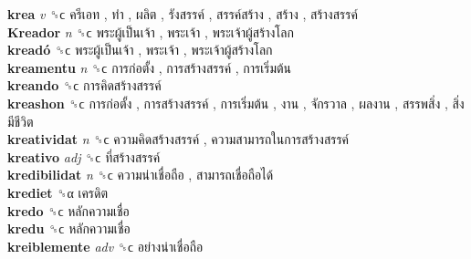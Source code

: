 \textbf{krea} \emph{v}  ␝ϲ   ครีเอท ,  ทำ ,  ผลิต ,  รังสรรค์ ,  สรรค์สร้าง ,  สร้าง ,  สร้างสรรค์   \\
\textbf{Kreador} \emph{n}  ␝ϲ   พระผู้เป็นเจ้า ,  พระเจ้า ,  พระเจ้าผู้สร้างโลก   \\
\textbf{kreadó} ␝ϲ   พระผู้เป็นเจ้า ,  พระเจ้า ,  พระเจ้าผู้สร้างโลก   \\
\textbf{kreamentu} \emph{n}  ␝ϲ   การก่อตั้ง ,  การสร้างสรรค์ ,  การเริ่มต้น   \\
\textbf{kreando} ␝ϲ   การคิดสร้างสรรค์   \\
\textbf{kreashon} ␝ϲ   การก่อตั้ง ,  การสร้างสรรค์ ,  การเริ่มต้น ,  งาน ,  จักรวาล ,  ผลงาน ,  สรรพสิ่ง ,  สิ่งมีชีวิต   \\
\textbf{kreatividat} \emph{n}  ␝ϲ   ความคิดสร้างสรรค์ ,  ความสามารถในการสร้างสรรค์   \\
\textbf{kreativo} \emph{adj}  ␝ϲ   ที่สร้างสรรค์   \\
\textbf{kredibilidat} \emph{n}  ␝ϲ   ความน่าเชื่อถือ ,  สามารถเชื่อถือได้   \\
\textbf{krediet} ␝α   เครดิต   \\
\textbf{kredo} ␝ϲ   หลักความเชื่อ   \\
\textbf{kredu} ␝ϲ   หลักความเชื่อ   \\
\textbf{kreiblemente} \emph{adv}  ␝ϲ   อย่างน่าเชื่อถือ   \\
